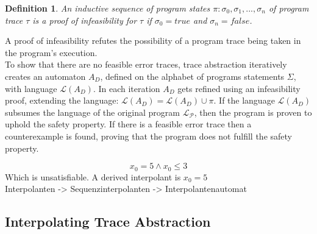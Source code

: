 \documentclass{article}
\newtheorem{mydef}{Definition}
\newcommand\mycom[1]{}
\newcommand\mycom[1]{#1}
\newcommand{\jw}[1]{\mycom{\todo[color=blue!40,inline]{\small JW: #1}}}
\begin{document}
\begin{mydef}
	An inductive sequence  of program states $\pi: \sigma_0, \sigma_1,..., \sigma_n$ of program trace $\tau$ is a proof of infeasibility for $\tau$ if $\sigma_0 = true$ and $\sigma_n = false$.
\end{mydef}
A proof of infeasibility refutes the possibility of a program trace being taken in the program's execution.\\
To show that there are no feasible error traces, trace abstraction iteratively creates an automaton $A_D$, defined on the alphabet of programs statements $\Sigma$, with language $\mathcal{L}(A_D)$. In each iteration $A_D$ gets refined using an infeasibility proof, extending the language: $\mathcal{L}(A_D) = \mathcal{L}(A_D) \cup \pi$.
If the language $\mathcal{L}(A_D)$ subsumes the language of the original program $\mathcal{L_P}$, then the program is proven to uphold the safety property.
If there is a feasible error trace then a counterexample is found, proving that the program does not fulfill the safety property.

\jw{TODO}

\begin{equation}
	x_0 = 5 \land x_0 \leq 3
\end{equation}
Which is unsatisfiable. A derived interpolant is $x_0 = 5$ \\
	Interpolanten -> Sequenzinterpolanten \cite{10.1007/11691372_33}-> Interpolantenautomat

\vspace*{2cm}

\subsection{Interpolating Trace Abstraction}
\end{document}
